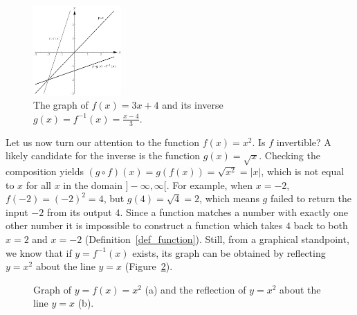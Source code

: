 \fi
\fi

\ifvc
\begin{figure}
	\begin{center}
			\includegraphics[width=0.3\textwidth]{fig_functions_38}
	\caption{The graph of $f(x) = 3x+4$ and its inverse $g(x)=f^{-1}(x)=\frac{x-4}{3}$.}
	\label{fig_functions_38}
	\end{center}
\end{figure}
\fi

Let us now turn our attention to the function $f(x) = x^2$.  Is $f$ invertible?  A likely candidate for the inverse is the function $g(x) = \sqrt{x}$.  Checking the composition yields $(g\circ f)(x) = g(f(x)) = \sqrt{x^2} = |x|$, which is not equal to $x$ for all $x$ in the domain $]-\infty, \infty[$.  For example, when $x=-2$,  $f(-2)= (-2)^2 = 4$, but $g(4) = \sqrt{4}=2$, which means $g$ failed to return the input $-2$ from its output $4$. Since a function matches a number with exactly one other number it is impossible to construct a function which takes $4$ back to both $x=2$ and $x=-2$  (Definition~\ref{def_function}).  Still, from a graphical standpoint, we know that if $y=f^{-1}(x)$ exists, its graph can be obtained by reflecting $y=x^2$ about the line $y=x$ (Figure~\ref{fig_functions_39}).

\begin{figure}[h]
\centerline{
\hspace{0.1cm}
}
\caption{Graph of $y=f(x)=x^2$ (a) and the reflection of $y=x^2$ about the line $y=x$ (b). }
\label{fig_functions_39}
\end{figure}

